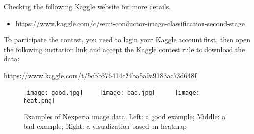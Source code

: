 \documentclass[11pt]{article}
\begin{document}
Checking the following Kaggle website for more details. 
\begin{itemize}
\item \url{https://www.kaggle.com/c/semi-conductor-image-classification-second-stage}
\end{itemize}
\noindent To participate the contest, you need to login your Kaggle account first, then open the following invitation link and accept the Kaggle contest rule to download the data: 

\begin{center}
\url{https://www.kaggle.com/t/5cbb376414c24ba5a9a9183ac73d648f}
\end{center}


\begin{figure}[htbp]
\begin{centering}
	\texttt{[image: good.jpg]}  \ \  \ \
	\texttt{[image: bad.jpg]}  \ \ \ \ \
	\texttt{[image: heat.png]}  
	\caption{Examples of Nexperia image data. Left: a good example; Middle: a bad example; Right: a visualization based on heatmap}
	\label{fig:nexperia}
	\end{centering}
\end{figure}
\end{document}
